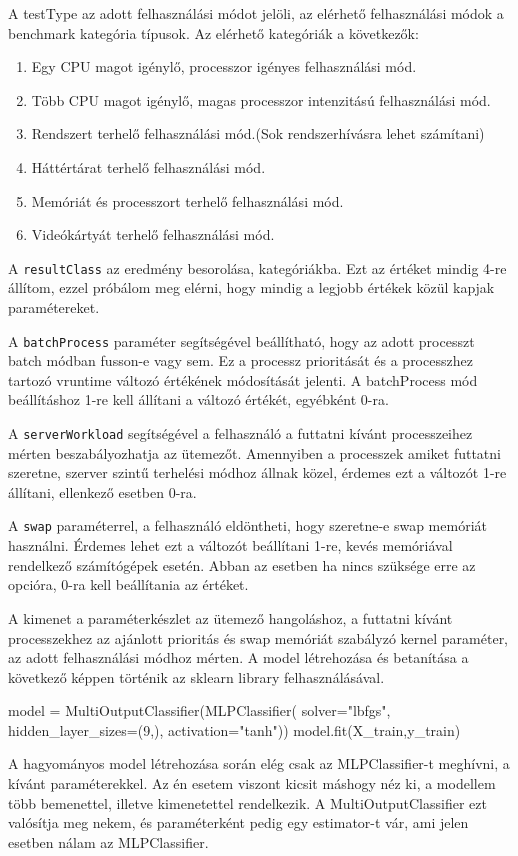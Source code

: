 A testType az adott felhasználási módot jelöli, az elérhető felhasználási módok a benchmark kategória típusok. Az elérhető kategóriák a következők: 
\begin{enumerate}
\item Egy CPU magot igénylő, processzor igényes felhasználási mód.
\item Több CPU magot igénylő, magas processzor intenzitású felhasználási mód.
\item Rendszert terhelő felhasználási mód.(Sok rendszerhívásra lehet számítani)
\item Háttértárat terhelő felhasználási mód.
\item Memóriát és processzort terhelő felhasználási mód.
\item Videókártyát terhelő felhasználási mód.
\end{enumerate}

A \texttt{resultClass} az eredmény besorolása, kategóriákba. Ezt az értéket mindig 4-re állítom, ezzel próbálom meg elérni, hogy mindig a legjobb értékek közül kapjak paramétereket.

A \texttt{batchProcess} paraméter segítségével beállítható, hogy az adott processzt batch módban fusson-e vagy sem. Ez a processz prioritását és a processzhez tartozó vruntime változó értékének módosítását jelenti. A batchProcess mód beállításhoz 1-re kell állítani a változó értékét, egyébként 0-ra.

A \texttt{serverWorkload} segítségével a felhasználó a futtatni kívánt processzeihez mérten beszabályozhatja az ütemezőt. Amennyiben a processzek amiket futtatni szeretne, szerver szintű terhelési módhoz állnak közel, érdemes ezt a változót 1-re állítani, ellenkező esetben 0-ra.

A \texttt{swap} paraméterrel, a felhasználó eldöntheti, hogy szeretne-e swap memóriát használni. Érdemes lehet ezt a változót beállítani 1-re, kevés memóriával rendelkező számítógépek esetén. Abban az esetben ha nincs szüksége erre az opcióra, 0-ra kell beállítania az értéket.

A kimenet a paraméterkészlet az ütemező hangoláshoz, a futtatni kívánt processzekhez az ajánlott prioritás és swap memóriát szabályzó kernel paraméter, az adott felhasználási módhoz mérten.
A model létrehozása és betanítása a következő képpen történik az sklearn library felhasználásával. 
\begin{python}
model = MultiOutputClassifier(MLPClassifier(
	solver="lbfgs",
	hidden_layer_sizes=(9,),
	activation="tanh"))
model.fit(X_train,y_train)
\end{python}
A hagyományos model létrehozása során elég csak az MLPClassifier-t meghívni, a kívánt paraméterekkel. Az én esetem viszont kicsit máshogy néz ki, a modellem több bemenettel, illetve kimenetettel rendelkezik. A MultiOutputClassifier ezt valósítja meg nekem, és paraméterként pedig egy estimator-t vár, ami jelen esetben nálam az MLPClassifier.

